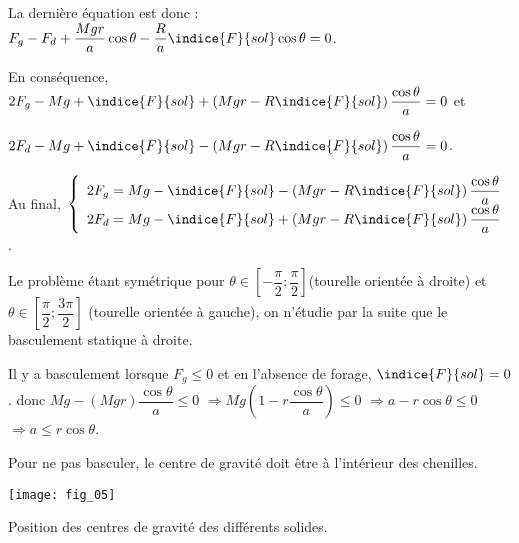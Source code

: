 \begin{corrige}
La dernière équation est donc :$  F_g - F_d+\dfrac{Mgr}{a} \cos \theta-\dfrac{R}{a}\indice{F}{sol} \cos \theta= 0$.

En conséquence, 
$2F_g-Mg + \indice{F}{sol}+\left(Mgr -R\indice{F}{sol}\right) \dfrac{\cos \theta}{a}= 0$ et

$2F_d-Mg + \indice{F}{sol} -\left(Mgr -R\indice{F}{sol}\right) \dfrac{ \cos \theta}{a}= 0$.

Au final, 
$\left\{
\begin{array}{l}
2F_g =  Mg - \indice{F}{sol}-\left(Mgr -R\indice{F}{sol}\right) \dfrac{\cos \theta}{a} \\
2F_d = Mg - \indice{F}{sol} +\left(Mgr -R\indice{F}{sol}\right) \dfrac{ \cos \theta}{a}
\end{array}
\right.$.

\end{corrige}
\else
\fi

\ifprof
\else
Le problème étant symétrique pour $\theta \in \left[-\dfrac{\pi}{2};\dfrac{\pi}{2}\right]$(tourelle orientée à droite) et $\theta \in \left[\dfrac{\pi}{2};\dfrac{3\pi}{2}\right]$ (tourelle orientée à gauche), on n’étudie par la suite que le basculement statique à droite. 
\fi

\ifprof
\begin{corrige}
Il y a basculement lorsque $F_g \leq 0 $ et en l'absence de forage, $\indice{F}{sol}=0$. donc 
$Mg -\left(Mgr \right) \dfrac{\cos \theta}{a} \leq 0$
$\Rightarrow Mg \left(1 -r\dfrac{\cos \theta}{a} \right)  \leq 0$
$\Rightarrow a -r\cos \theta \leq 0$
$\Rightarrow a \leq r\cos \theta$.


\end{corrige}
\else
\fi

\ifprof
\begin{corrige}
Pour ne pas basculer, le centre de gravité doit être à l'intérieur des chenilles.
\end{corrige}
\else
\fi

\begin{marginfigure}
\centering
\texttt{[image: fig\_05]}
\caption{ Position des centres 
de gravité des différents solides. \label{Cy_11_Ch_03_PFS_3D_TD_01_fig_05}}
\end{marginfigure}

